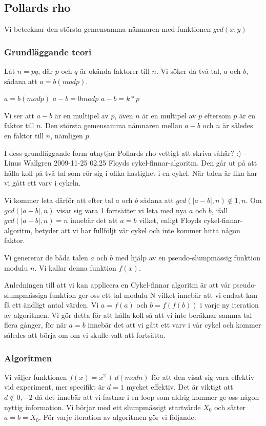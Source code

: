 \documentclass[a4paper,12pt]{article}
\renewcommand{\*}{\ensuremath{\cdot}}
\begin{document}
\subsection{Pollards rho}

Vi betecknar den största gemensamma nämnaren med funktionen $gcd(x,y)$
\subsubsection{Grundläggande teori}

Låt $n = pq$, där $p$ och $q$ är okända faktorer till $n$. 
Vi söker då två tal, $a$ och $b$, sådana att $a = b (mod p)$.

$a=b(mod p)$
$a-b = 0 mod p$
$a - b = k*p$

Vi ser att $a-b$ är en multipel av $p$, även $n$ är en multipel av $p$ eftersom $p$ är en faktor till $n$. Den största gemensamma nämnaren mellan $a-b$ och $n$ är således en faktor till $n$, nämligen $p$. 

I dess grundläggande form utnytjar Pollards rho vettigt att skriva såhär? :) -Linus Wallgren 2009-11-25 02.25  Floyds cykel-finnar-algoritm. Den går ut på att hålla koll på två tal som rör sig i olika hastighet i en cykel. När talen är lika har vi gått ett varv i cykeln.

Vi kommer leta därför att efter tal $a$ och $b$ sådana att $gcd(|a-b|, n) \notin {1, n}$. Om $gcd(|a-b|, n)$ visar sig vara 1 fortsätter vi leta med nya $a$ och $b$, ifall $gcd(|a-b|, n) = n$ innebär det att $a=b$ vilket, enligt Floyds cykel-finnar-algoritm, betyder att vi har fullföljt vår cykel och inte kommer hitta någon faktor.

Vi genererar de båda talen $a$ och $b$ med hjälp av en pseudo-slumpmässig funktion modulu $n$. Vi kallar denna funktion $f(x)$.

Anledningen till att vi kan applicera en Cykel-finnar algoritm är att vår pseudo-slumpmässiga funktion ger oss ett tal modulu N vilket innebär att vi endast kan få ett ändligt antal värden. Vi $a=f(a)$ och $b=f(f(b))$ i varje ny iteration av algoritmen. Vi gör detta för att hålla koll så att vi inte beräknar samma tal flera gånger, för när $a=b$ innebär det att vi gått ett varv i vår cykel och kommer således att börja om om vi skulle valt att fortsätta.

\subsubsection{Algoritmen}
Vi väljer funktionen $f(x) = x^2 + d (mod n)$ för att den visat sig vara effektiv vid experiment, mer specifikt är $d=1$ mycket effektiv. Det är viktigt att $d \notin {0, -2}$ då det innebär att vi  fastnar i en loop som aldrig kommer ge oss någon nyttig information. Vi börjar med ett slumpmässigt startvärde $X_0$ och sätter $a=b=X_0$. För varje iteration av algoritmen gör vi följande:
\end{document}
